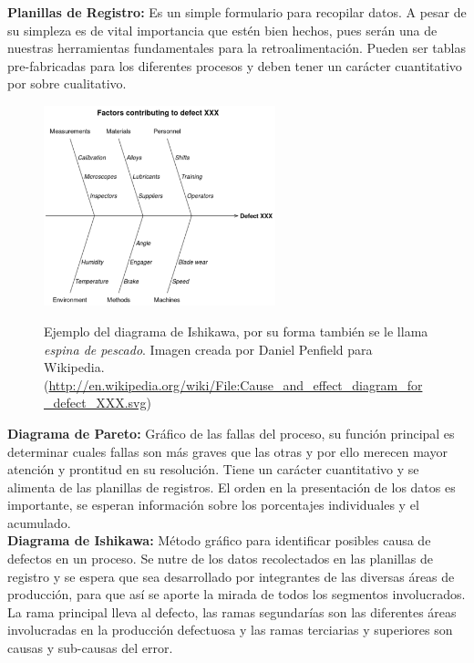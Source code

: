\documentclass[spanish, fleqn]{article}
\begin{document}
	\textbf{Planillas de Registro:} Es un simple formulario para recopilar 
	datos. A pesar de su simpleza es de vital importancia que estén bien hechos,
	pues serán una de nuestras herramientas fundamentales para la
	retroalimentación. Pueden ser tablas pre-fabricadas para los diferentes
	procesos y deben tener un carácter cuantitativo por sobre cualitativo.\\
	\begin{figure}
		\begin{center}
			\vspace{-0.8cm}
			\includegraphics[width=0.6\textwidth]{Ishikawa.png}
		\end{center}
		Ejemplo del diagrama de Ishikawa, por su forma también se le llama
		\emph{espina de pescado}. Imagen creada por Daniel Penfield para 
		Wikipedia. (\url{http://en.wikipedia.org/wiki/File:Cause_and_effect_diagram_for_defect_XXX.svg})
	\end{figure}
	\textbf{Diagrama de Pareto:} Gráfico de las fallas del proceso, su función
	principal es determinar cuales fallas son más graves que las otras y por
	ello merecen mayor atención y prontitud en su resolución. Tiene un carácter
	cuantitativo y se alimenta de las planillas de registros. El orden en la 
	presentación de los datos es importante, se esperan información sobre los
	porcentajes individuales y el acumulado.\\[.4cm]
	\textbf{Diagrama de Ishikawa:} Método gráfico para identificar posibles 
	causa de defectos en un proceso. Se nutre de los datos recolectados en las
	planillas de registro y se espera que sea desarrollado por integrantes de 
	las diversas áreas de producción, para que así se aporte la mirada de todos
	los segmentos involucrados. La rama principal lleva al defecto, las ramas
	segundarías son las diferentes áreas involucradas en la producción
	defectuosa y las ramas terciarias y superiores son causas y sub-causas del
	error.
\end{document}
